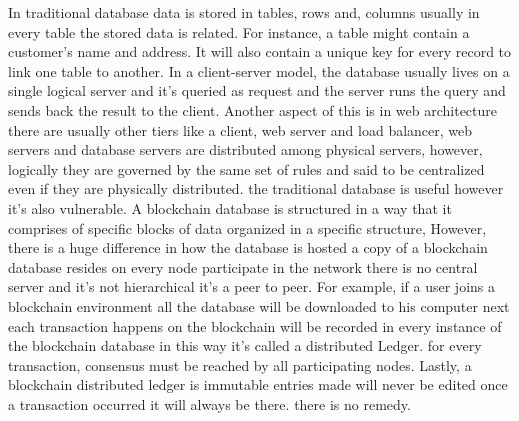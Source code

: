 In traditional database data is stored in tables, rows and, columns usually in every table the stored data is related. 
For instance, a table might contain a customer's name and address. It will also contain a unique key for every record to link one table to another.
In a client-server model, the database usually lives on a single logical server and it's queried as request and the server runs the query and sends back the result to the client. Another aspect of this is in web architecture there are usually other tiers like a client, web server and load balancer, web servers and database servers are distributed among physical servers, however, logically they are governed by the same set of rules and said to be centralized even if they are physically distributed. the traditional database is useful however it's also vulnerable.
A blockchain database is structured in a way that it comprises of specific blocks of data organized in a specific structure, However, there is a huge difference in how the database is hosted a copy of a blockchain database resides on every node participate in the network there is no central server and it's not hierarchical it's a peer to peer. For example, if a user joins a blockchain environment all the database will be downloaded to his computer next each transaction happens on the blockchain will be recorded in every instance of the blockchain database in this way it's called a distributed Ledger. 
for every transaction, consensus must be reached by all participating nodes.
Lastly, a blockchain distributed ledger is immutable entries made will never be edited once a transaction occurred it will always be there. there is no remedy. \\ 

